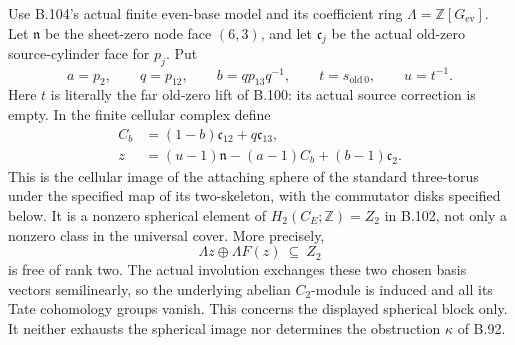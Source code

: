 \label{stmt:B105}
Use B.104's actual finite even-base model and its coefficient ring
$\Lambda=\mathbb Z[G_{\mathrm{ev}}]$. Let $\mathfrak n$ be the sheet-zero
node face $(6,3)$, and let $\mathfrak c_j$ be the actual old-zero
source-cylinder face for $p_j$. Put
\[
 a=p_2,\qquad q=p_{12},\qquad b=q p_{13}q^{-1},\qquad
 t=s_{\mathrm{old}\,0},\qquad u=t^{-1}.
\]
Here $t$ is literally the far old-zero lift of B.100: its actual
source correction is empty. In the finite cellular complex define
\begin{equation}\label{eq:B105-cycle}
 \begin{aligned}
 C_b&=(1-b)\mathfrak c_{12}+q\mathfrak c_{13},\\
 z&=(u-1)\mathfrak n-(a-1)C_b+(b-1)\mathfrak c_2.
 \end{aligned}
\end{equation}
This is the cellular image of the attaching sphere of the standard
three-torus under the specified map of its two-skeleton, with the
commutator disks specified below. It is a
nonzero spherical element of
$H_2(C_E;\mathbb Z)=Z_2$ in B.102, not only a nonzero class in
the universal cover. More precisely,
\begin{equation}\label{eq:B105-block}
 \Lambda z\oplus\Lambda F(z)\ \subseteq\ Z_2
\end{equation}
is free of rank two. The actual involution exchanges these two
chosen basis vectors semilinearly, so the underlying abelian
$C_2$-module is induced and all its Tate cohomology groups vanish.
This concerns the displayed spherical block only. It neither
exhausts the spherical image nor determines the obstruction
$\kappa$ of B.92.

